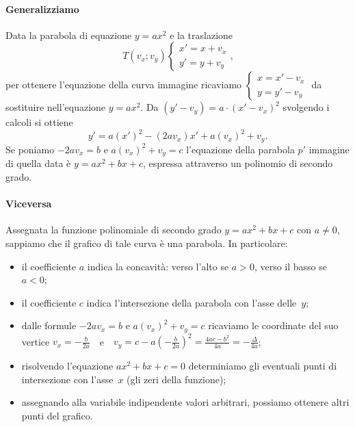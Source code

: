 \paragraph{Generalizziamo}
Data la parabola di equazione $y=ax^2$ e la traslazione \[{T}(v_x;v_y)\left\{\begin{array}{l}{x'=x+v_x}\\{y'=y+v_y}\end{array}\right.\text{,}\] per ottenere l'equazione della curva immagine ricaviamo $\left\{\begin{array}{l}{x=x'-v_x}\\{y=y'-v_y}\end{array}\right.$ da sostituire nell'equazione $y={ax}^2$. Da $(y'-v_y)=a\cdot (x'-v_x)^2$ svolgendo i calcoli si ottiene \[y'=a(x')^2-(2av_x)x'+a(v_x)^2+v_y.\] Se poniamo $-2{av}_x=b$ e $a(v_x)^2+v_y=c$ l'equazione della parabola $p'$ immagine di quella data è $y={ax}^2+{bx}+c$, espressa attraverso un polinomio di secondo grado.
\paragraph{Viceversa}
Assegnata la funzione polinomiale di secondo grado $y={ax}^2+{bx}+c$ con $a\neq 0$, sappiamo che il grafico di tale curva è una parabola. In particolare:
\begin{itemize}
\item il coefficiente $a$ indica la concavità: verso l'alto se $a>0$, verso il basso se $a<0$;
\item il coefficiente $c$ indica l'intersezione della parabola con l'asse delle~$y$;
\item dalle formule $-2av_x=b$ e $a(v_x)^2+v_y=c$ ricaviamo le coordinate del suo vertice $v_x=-\frac b{2a}$~~e~~$v_y=c-a\left(-\frac b{2a}\right)^2=\frac{4ac-b^2}{4a}=-\frac{\Delta }{4a}$;
\item risolvendo l'equazione ${ax}^2+{bx}+c=0$ determiniamo gli eventuali punti di intersezione con l'asse~$x$ (gli zeri della funzione);
\item assegnando alla variabile indipendente valori arbitrari, possiamo ottenere altri punti del grafico.
\end{itemize}

